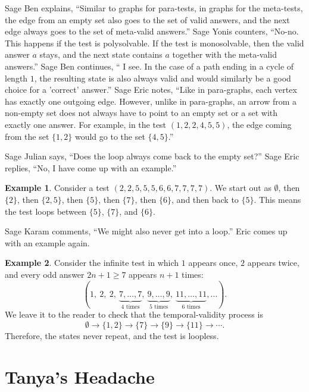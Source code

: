 \documentclass[12pt,reqno]{article}
\theoremstyle{plain}
\theoremstyle{definition}
\newtheorem{example}{Example}
\theoremstyle{remark}
\begin{document}
Sage Ben explains, ``Similar to graphs for para-tests, in graphs for the meta-tests, the edge from an empty set also goes to the set of valid answers, and the next edge always goes to the set of meta-valid answers.'' Sage Yonis counters, ``No-no. This happens if the test is polysolvable. If the test is monosolvable, then the valid answer $a$ stays, and the next state contains $a$ together with the meta-valid answers.'' Sage Ben continues, `` I see. In the case of a path ending in a cycle of length $1$, the resulting state is also always valid and would similarly be a good choice for a 'correct' answer.'' Sage Eric notes, ``Like in para-graphs, each vertex has exactly one outgoing edge. However, unlike in para-graphs, an arrow from a non-empty set does not always have to point to an empty set or a set with exactly one answer. For example, in the test $(1, 2, 2, 4, 5, 5)$, the edge coming from the set $\{1, 2\}$ would go to the set $\{4, 5\}$.''

Sage Julian says, ``Does the loop always come back to the empty set?'' Sage Eric replies, ``No, I have come up with an example.''

\begin{example}
    Consider a test $(2, 2, 5, 5, 5, 6, 6, 7, 7, 7, 7)$. We start out as $\emptyset$, then $\{2\}$, then $\{2, 5\}$, then $\{5\}$, then $\{7\}$, then $\{6\}$, and then back to $\{5\}$. This means the test loops between $\{5\}$, $\{7\}$, and $\{6\}$. 
\end{example}

Sage Karam comments, ``We might also never get into a loop.'' Eric comes up with an example again.

\begin{example}
Consider the infinite test in which $1$ appears once, $2$ appears twice, and every odd answer $2n+1\geq 7$ appears $n+1$ times:
\[
(1,\ 2,\ 2,\
\underbrace{7,\ldots,7}_{4\text{ times}},\
\underbrace{9,\ldots,9}_{5\text{ times}},\
\underbrace{11,\ldots,11}_{6\text{ times}},\ldots).
\]
We leave it to the reader to check that the temporal-validity process is
\[
\emptyset\longrightarrow \{1,2\}\longrightarrow
\{7\}\longrightarrow\{9\}\longrightarrow\{11\}\longrightarrow\cdots.
\]
Therefore, the states never repeat, and the test is loopless.
\end{example}

\section*{Tanya's Headache}
\end{document}
